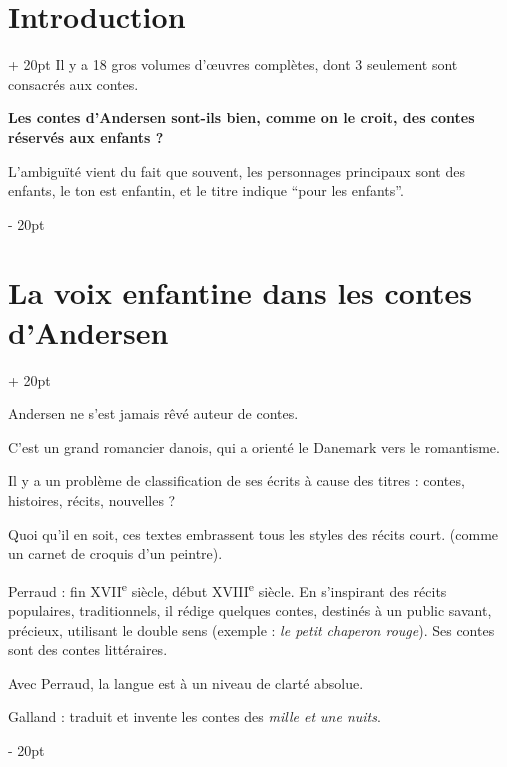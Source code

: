 \documentclass[a4paper, 12pt, twoside]{article}
\newcommand{\ind}[1][20pt]{\advance\leftskip + #1}
\newcommand{\deind}[1][20pt]{\advance\leftskip - #1}
\newenvironment{indt}[2][20pt]{#2 \par \ind[#1]}{\par \deind} %
\begin{document}
\begin{indt}{\section*{Introduction}}
        Il y a 18 gros volumes d'\oe uvres complètes, dont 3 seulement  sont consacrés aux contes.
        
        \vspace{12pt}
        
        \textbf{Les contes d'Andersen sont-ils bien, comme on le croit, des contes réservés aux enfants ?}
        
        L'ambiguïté vient du fait que souvent, les personnages principaux sont des enfants, le ton est enfantin, et le titre indique ``pour les enfants''.
        
    \end{indt}
    
    \vspace{12pt}
    
    \begin{indt}{\section{La voix enfantine dans les contes d'Andersen}}
        
        Andersen ne s'est jamais rêvé auteur de contes.
        
        C'est un grand romancier danois, qui a orienté le Danemark vers le romantisme.
        
        Il y a un problème de classification de ses écrits à cause des titres : contes, histoires, récits, nouvelles ?
        
        Quoi qu'il en soit, ces textes embrassent tous les styles des récits court. (comme un carnet de croquis d'un peintre).
        
        \vspace{12pt}
        
        Perraud : fin XVII\textsuperscript e siècle, début XVIII\textsuperscript e siècle.
        En s'inspirant des récits populaires, traditionnels, il rédige quelques contes, destinés à un public savant, précieux, utilisant le double sens (exemple : \textit{le petit chaperon rouge}). Ses contes sont des contes littéraires.
        
        Avec Perraud, la langue est à un niveau de clarté absolue.
        
        \vspace{12pt}
        
        Galland : traduit et invente les contes des \textit{mille et une nuits}.
        
        \vspace{12pt}
        

\end{indt}
\end{document}
